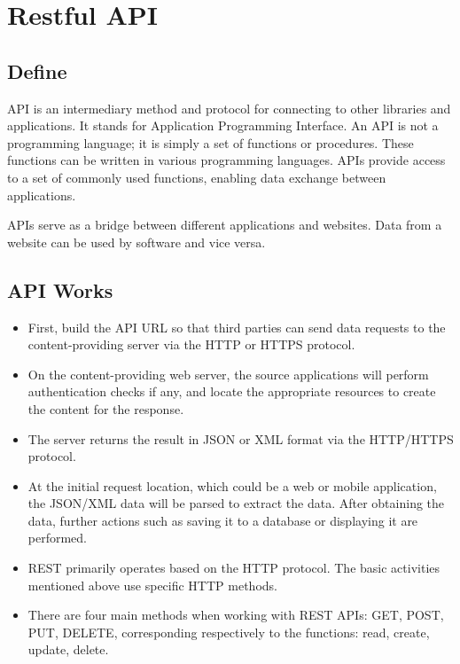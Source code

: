 \documentclass[../Main.tex]{subfiles}
\begin{document}
\section{Restful API}

\subsection{Define}

API is an intermediary method and protocol for connecting to other libraries and applications.
It stands for Application Programming Interface.
An API is not a programming language; it is simply a set of functions or procedures.
These functions can be written in various programming languages.
APIs provide access to a set of commonly used functions, enabling data exchange between applications.

APIs serve as a bridge between different applications and websites.
Data from a website can be used by software and vice versa.

\subsection{API Works}

\begin{itemize}
    \item First, build the API URL so that third parties can send data requests to the content-providing server via the HTTP or HTTPS protocol.
    \item On the content-providing web server, the source applications will perform authentication checks if any, and locate the appropriate resources to create the content for the response.
    \item The server returns the result in JSON or XML format via the HTTP/HTTPS protocol.
    \item At the initial request location, which could be a web or mobile application, the JSON/XML data will be parsed to extract the data.
          After obtaining the data, further actions such as saving it to a database or displaying it are performed.
    \item REST primarily operates based on the HTTP protocol.
          The basic activities mentioned above use specific HTTP methods.
    \item There are four main methods when working with REST APIs: GET, POST, PUT, DELETE, corresponding respectively to the functions: read, create, update, delete.
\end{itemize}
\end{document}
